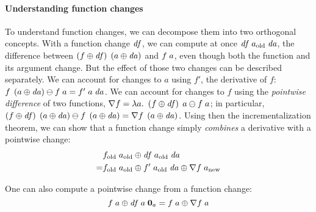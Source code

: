 \paragraph{Understanding function changes}
To understand function changes, we can decompose them
into two orthogonal concepts. With a function change $\mathit{df}$, we can compute at
once $\App{\App{\D f}{\Old{a}}}{\D a}$, the difference between $\App {\Upd*{f}} {\Upd*{a}}$ and $\App
{{f}} {{a}}$, even though both the function and its argument change.
But the effect of those two changes can be described separately.
We can account for changes to $a$ using $f'$, the derivative of $f$: $\App{{f}} {\Upd*{a}} \DIFF \App{{f}} {{a}} = \App{\App{f'}{{a}}}{\D a}$.
We can account for changes to $f$ using the \emph{pointwise difference} of two functions, $\nabla
f = \Lam{a}{\App{\Upd*{f}}{a} \DIFF \App{{f}}{a}}$; in particular, $\Upd*{f} \APP \Upd*{a} \DIFF {f} \APP \Upd*{a} = \nabla f \APP \Upd*{a}$.
Using then the incrementalization theorem, we can show that a function change simply \emph{combines} a derivative with a pointwise change:
%
%
%
\begin{align*}
  & \Update{\App {\Old{f}} {\Old{a}}}{\App{\App{\D f}{\Old{a}}}{\D a}} \\
= & \Update{\App{\Old{f}}{\Old{a}}}{\App{\App{f'}{\Old{a}}}{\D a}} \UPDATE \App{\nabla f}{\New{a}}
\end{align*}

One can also compute a pointwise change from a function change:
\[
  \Update{\App {f} {a}}{\App{\App{\D f}{a}}{\Nil{a}}}
= \App{f}{a} \UPDATE \App{\nabla f}{a}
\]

